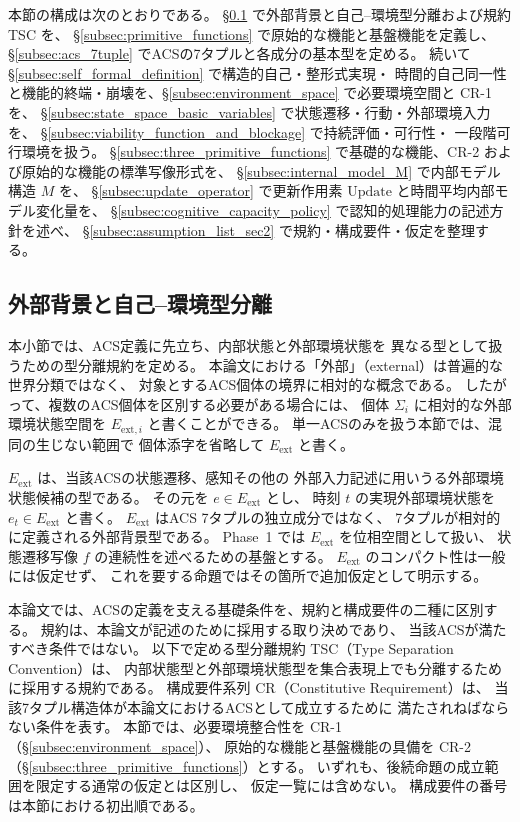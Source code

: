 本節の構成は次のとおりである。
\S\ref{subsec:wellformedness} で外部背景と自己--環境型分離および規約 TSC を、
\S\ref{subsec:primitive_functions} で原始的な機能と基盤機能を定義し、
\S\ref{subsec:acs_7tuple} でACSの7タプルと各成分の基本型を定める。
続いて \S\ref{subsec:self_formal_definition} で構造的自己・整形式実現・
時間的自己同一性と機能的終端・崩壊を、\S\ref{subsec:environment_space} で必要環境空間と CR-1 を、
\S\ref{subsec:state_space_basic_variables} で状態遷移・行動・外部環境入力を、
\S\ref{subsec:viability_function_and_blockage} で持続評価・可行性・
一段階可行環境を扱う。
\S\ref{subsec:three_primitive_functions} で基礎的な機能、CR-2 および原始的な機能の標準写像形式を、
\S\ref{subsec:internal_model_M} で内部モデル構造 $M$ を、
\S\ref{subsec:update_operator} で更新作用素 $\mathrm{Update}$ と時間平均内部モデル変化量を、
\S\ref{subsec:cognitive_capacity_policy} で認知的処理能力の記述方針を述べ、
\S\ref{subsec:assumption_list_sec2} で規約・構成要件・仮定を整理する。

\subsection{外部背景と自己--環境型分離}
\label{subsec:wellformedness}

本小節では、ACS定義に先立ち、内部状態と外部環境状態を
異なる型として扱うための型分離規約を定める。
本論文における「外部」（external）は普遍的な世界分類ではなく、
対象とするACS個体の境界に相対的な概念である。
したがって、複数のACS個体を区別する必要がある場合には、
個体 $\Sigma_i$ に相対的な外部環境状態空間を
$E_{\mathrm{ext},i}$ と書くことができる。
単一ACSのみを扱う本節では、混同の生じない範囲で
個体添字を省略して $E_{\mathrm{ext}}$ と書く。

$E_{\mathrm{ext}}$ は、当該ACSの状態遷移、感知その他の
外部入力記述に用いうる外部環境状態候補の型である。
その元を $e\in E_{\mathrm{ext}}$ とし、
時刻 $t$ の実現外部環境状態を
$e_t\in E_{\mathrm{ext}}$
と書く。
$E_{\mathrm{ext}}$ はACS 7タプルの独立成分ではなく、
7タプルが相対的に定義される外部背景型である。
Phase~1 では $E_{\mathrm{ext}}$ を位相空間として扱い、
状態遷移写像 $f$ の連続性を述べるための基盤とする。
$E_{\mathrm{ext}}$ のコンパクト性は一般には仮定せず、
これを要する命題ではその箇所で追加仮定として明示する。

本論文では、ACSの定義を支える基礎条件を、規約と構成要件の二種に区別する。
規約は、本論文が記述のために採用する取り決めであり、
当該ACSが満たすべき条件ではない。
以下で定める型分離規約 TSC（Type Separation Convention）は、
内部状態型と外部環境状態型を集合表現上でも分離するために採用する規約である。
構成要件系列 CR（Constitutive Requirement）は、
当該7タプル構造体が本論文におけるACSとして成立するために
満たされねばならない条件を表す。
本節では、必要環境整合性を CR-1（\S\ref{subsec:environment_space}）、
原始的な機能と基盤機能の具備を CR-2（\S\ref{subsec:three_primitive_functions}）とする。
いずれも、後続命題の成立範囲を限定する通常の仮定とは区別し、
仮定一覧には含めない。
構成要件の番号は本節における初出順である。

